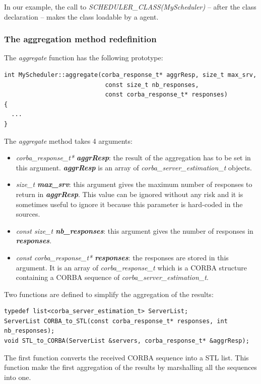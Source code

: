 In our example, the call to \textit{SCHEDULER\_CLASS(MyScheduler)} --
after the class declaration -- makes the class loadable by a \diet agent.

\subsubsection{The aggregation method redefinition}
The \textit{aggregate} function has the following prototype:
\begin{verbatim}
int MyScheduler::aggregate(corba_response_t* aggrResp, size_t max_srv,
                            const size_t nb_responses,
                            const corba_response_t* responses)
{
  ...
}
\end{verbatim}

\noindent The \textit{aggregate} method takes 4 arguments:
\begin{itemize}
  \item \textit{corba\_response\_t* \bf aggrResp}: the result of the aggregation
    has to be set in this argument. \textit{\bf aggrResp} is an array of
    \textit{corba\_server\_estimation\_t} objects. 
  \item \textit{size\_t \bf max\_srv}: this argument gives the maximum number
    of responses to return in \textit{\bf aggrResp}. This value can be ignored
    without any risk and it is sometimes useful to ignore it because this
    parameter is hard-coded in the \diet sources.
  \item \textit{const size\_t \bf nb\_responses}: this argument gives the number
    of responses in \textit{\bf responses}.
  \item \textit{const corba\_response\_t* \bf responses}: the responses are
    stored in this argument. It is an array of \textit{corba\_response\_t}
    which is a CORBA structure containing a CORBA sequence of
    \textit{corba\_server\_estimation\_t}.
\end{itemize}

\noindent Two functions are defined to simplify the aggregation of the results:
\begin{verbatim}
typedef list<corba_server_estimation_t> ServerList;
ServerList CORBA_to_STL(const corba_response_t* responses, int nb_responses);
void STL_to_CORBA(ServerList &servers, corba_response_t* &aggrResp);
\end{verbatim}
The first function converts the received CORBA sequence into a STL list. This
function make the first aggregation of the results by marshalling all the
sequences into one.

